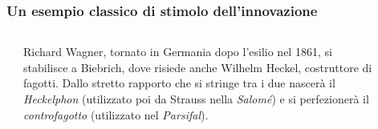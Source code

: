 \begin{frame}
    \frametitle{Un esempio classico di stimolo dell'innovazione}

    \begin{columns}[T]
        \begin{column}{0.2\textwidth}
        \end{column}
        \begin{column}{0.5\textwidth}
            Richard Wagner, tornato in Germania dopo l'esilio nel 1861, si
            stabilisce a Biebrich, dove risiede anche Wilhelm Heckel,
            costruttore di fagotti. Dallo stretto rapporto che si stringe tra i due
            nascer\`a il \emph{Heckelphon} (utilizzato poi da Strauss nella
            \emph{Salom\'e}) e si perfezioner\`a il \emph{controfagotto} (utilizzato nel
            \emph{Parsifal}).
        \end{column}
        \begin{column}{0.05\textwidth}
        \end{column}
        \begin{column}{0.1\textwidth}
        \end{column}
    \end{columns}
\end{frame}

